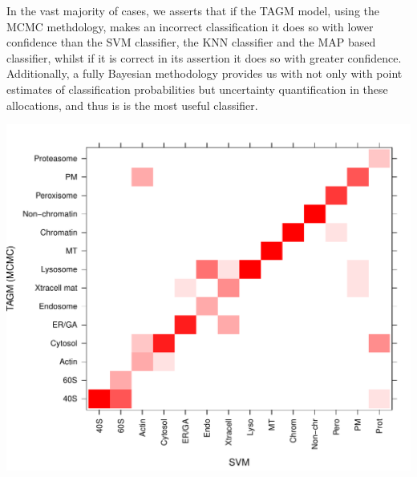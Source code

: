\documentclass[12pt,english]{article}\usepackage[]{graphicx}\usepackage[]{color}
\makeatletter
\def\maxwidth{ %
  \ifdim\Gin@nat@width>\linewidth
    \linewidth
  \else
    \Gin@nat@width
  \fi
}
\newenvironment{kframe}{%
 \def\at@end@of@kframe{}%
 \ifinner\ifhmode%
  \def\at@end@of@kframe{\end{minipage}}%
  \begin{minipage}{\columnwidth}%
 \fi\fi%
 \def\FrameCommand##1{\hskip\@totalleftmargin \hskip-\fboxsep
 \colorbox{shadecolor}{##1}\hskip-\fboxsep
     \hskip-\linewidth \hskip-\@totalleftmargin \hskip\columnwidth}%
 \MakeFramed {\advance\hsize-\width
   \@totalleftmargin\z@ \linewidth\hsize
   \@setminipage}}%
 {\par\unskip\endMakeFramed%
 \at@end@of@kframe}
\newenvironment{knitrout}{}{} %
\makeatother
\begin{document}
In the vast majority of cases, we asserts that if the TAGM model, using the MCMC methdology, makes an incorrect classification it does so with lower confidence than the SVM classifier, the KNN classifier and the MAP based classifier, whilst if it is correct in its assertion it does so with greater confidence. Additionally, a fully Bayesian methodology provides us with not only with point estimates of classification probabilities but uncertainty quantification in these allocations, and thus is is the most useful classifier.

\begin{knitrout}
\color{fgcolor}\begin{kframe}


{\ttfamily\noindent\itshape\color{messagecolor}{\#\# Using\ \ as id variables\\\#\# Using\ \ as id variables\\\#\# Using\ \ as id variables\\\#\# Using\ \ as id variables\\\#\# Using\ \ as id variables}}\end{kframe}
\includegraphics[width=\maxwidth]{figure/unnamed-chunk-10-1} 

\end{knitrout}
\end{document}
